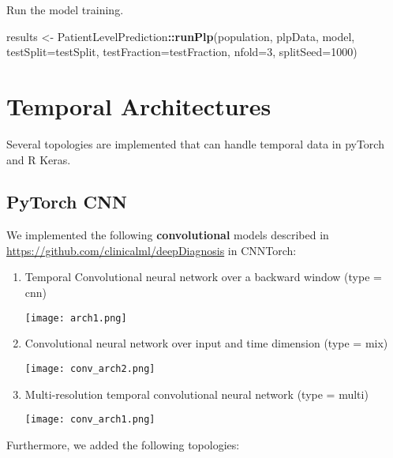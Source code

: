 \documentclass[]{article}
\newenvironment{Shaded}{\begin{snugshade}}{\end{snugshade}}
\newcommand{\KeywordTok}[1]{\textcolor[rgb]{0.13,0.29,0.53}{\textbf{#1}}}
\newcommand{\DataTypeTok}[1]{\textcolor[rgb]{0.13,0.29,0.53}{#1}}
\newcommand{\DecValTok}[1]{\textcolor[rgb]{0.00,0.00,0.81}{#1}}
\newcommand{\StringTok}[1]{\textcolor[rgb]{0.31,0.60,0.02}{#1}}
\newcommand{\OperatorTok}[1]{\textcolor[rgb]{0.81,0.36,0.00}{\textbf{#1}}}
\newcommand{\NormalTok}[1]{#1}
\begin{document}
Run the model training.

\begin{Shaded}
\begin{Highlighting}[]
\NormalTok{results <-}\StringTok{ }\NormalTok{PatientLevelPrediction}\OperatorTok{::}\KeywordTok{runPlp}\NormalTok{(population, plpData, }
\NormalTok{                                                    model,}
                                                    \DataTypeTok{testSplit=}\NormalTok{testSplit,}
                                                    \DataTypeTok{testFraction=}\NormalTok{testFraction,}
                                                    \DataTypeTok{nfold=}\DecValTok{3}\NormalTok{, }\DataTypeTok{splitSeed=}\DecValTok{1000}\NormalTok{) }
\end{Highlighting}
\end{Shaded}

\section{Temporal Architectures}\label{temporal-architectures}

Several topologies are implemented that can handle temporal data in
pyTorch and R Keras.

\subsection{PyTorch CNN}\label{pytorch-cnn}

We implemented the following \textbf{convolutional} models described in
\url{https://github.com/clinicalml/deepDiagnosis} in CNNTorch:

\begin{enumerate}
\def\labelenumi{\arabic{enumi})}
\item
  Temporal Convolutional neural network over a backward window (type =
  cnn)

  \texttt{[image: arch1.png]}
\item
  Convolutional neural network over input and time dimension (type =
  mix)

  \texttt{[image: conv\_arch2.png]}
\item
  Multi-resolution temporal convolutional neural network (type = multi)

  \texttt{[image: conv\_arch1.png]}
\end{enumerate}

Furthermore, we added the following topologies:
\end{document}
